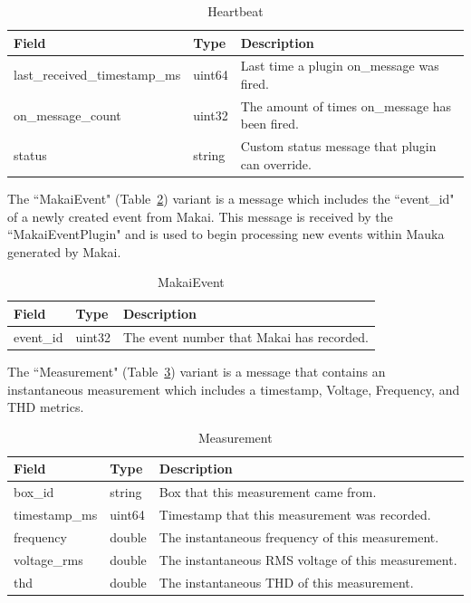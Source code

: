 \begin{table}[H]
	\centering
	\caption{Heartbeat}
	\begin{tabularx}{\textwidth}{llX}
		\toprule
		\textbf{Field} & \textbf{Type} & \textbf{Description} \\
		\midrule
		last\_received\_timestamp\_ms & uint64 & Last time a plugin on\_message was fired.  \\
		on\_message\_count & uint32 & The amount of times on\_message has been fired. \\
		status & string & Custom status message that plugin can override. \\
		\bottomrule
	\end{tabularx}
	\label{table:Heartbeat}
\end{table}

The ``MakaiEvent" (Table~\ref{table:MakaiEvent}) variant is a message which includes the ``event\_id" of a newly created event from Makai. This message is received by the ``MakaiEventPlugin" and is used to begin processing new events within Mauka generated by Makai.

\begin{table}[H]
	\centering
	\caption{MakaiEvent}
	\begin{tabularx}{\textwidth}{llX}
		\toprule
		\textbf{Field} & \textbf{Type} & \textbf{Description} \\
		\midrule
		event\_id & uint32 & The event number that Makai has recorded.  \\
		\bottomrule
	\end{tabularx}
	\label{table:MakaiEvent}
\end{table}

The ``Measurement" (Table~\ref{table:Measurement}) variant is a message that contains an instantaneous measurement which includes a timestamp, Voltage, Frequency, and THD metrics.

\begin{table}[H]
	\centering
	\caption{Measurement}
	\begin{tabularx}{\textwidth}{llX}
		\toprule
		\textbf{Field} & \textbf{Type} & \textbf{Description} \\
		\midrule
		box\_id & string  & Box that this measurement came from. \\
		timestamp\_ms & uint64 & Timestamp that this measurement was recorded. \\
		frequency & double & The instantaneous frequency of this measurement. \\
		voltage\_rms & double & The instantaneous RMS voltage of this measurement. \\
		thd & double & The instantaneous THD of this measurement. \\
		\bottomrule
	\end{tabularx}
	\label{table:Measurement}
\end{table}

